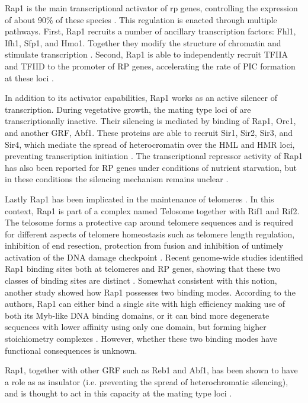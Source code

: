 Rap1 is the main transcriptional activator of \gls{rp} genes, controlling the expression of about 90\% of these species \cite{moehle:1991:association}. 
This regulation is enacted through multiple pathways.
First, Rap1 recruits a number of ancillary transcription factors: Fhl1, Ifh1, Sfp1, and Hmo1. Together they modify the structure of chromatin and stimulate transcription \cite{reja:2015:molecular}. 
Second, Rap1 is able to independently recruit TFIIA and TFIID to the promoter of RP genes, accelerating the rate of PIC formation at these loci \cite{papai:2010:tfiia}.


In addition to its activator capabilities, Rap1 works as an active silencer of transcription. 
During vegetative growth, the mating type loci of \cer{} are transcriptionally inactive. 
Their silencing is mediated by binding of Rap1, Orc1, and another GRF, Abf1. 
These proteins are able to recruit Sir1, Sir2, Sir3, and Sir4, which mediate the spread of heterocromatin over the HML and HMR loci, preventing transcription initiation \cite{kurtz:1991:rap1}. 
The transcriptional repressor activity of Rap1 has also been reported for RP genes under conditions of nutrient starvation, but in these conditions the silencing mechanism remains unclear \cite{reja:2015:molecular}. 


Lastly Rap1 has been implicated in the maintenance of telomeres \cite{lustig:1990:involvement}. 
In this context, Rap1 is part of a complex named Telosome together with Rif1 and Rif2. 
The telosome forms a protective cap around telomere sequences and is required for different aspects of telomere homeostasis such as telomere length regulation, inhibition of end resection, protection from fusion and inhibition of untimely activation of the DNA damage checkpoint \cite[for review see][]{wellinger:2012:everything}. 
Recent genome-wide studies identified Rap1 binding sites both at telomeres and RP genes, showing that these two classes of binding sites are distinct \cite{rhee:2011:comprehensive}. 
Somewhat consistent with this notion, another study showed how Rap1 possesses two binding modes. 
According to the authors, Rap1 can either bind a single site with high efficiency making use of both its Myb-like DNA binding domains, or it can bind more degenerate sequences with lower affinity using only one domain, but forming higher stoichiometry complexes \cite{feldmann:2014:dnabinding}. 
However, whether these two binding modes have functional consequences is unknown.

Rap1, together with other GRF such as Reb1 and Abf1, has been shown to have a role as as insulator (i.e. preventing the spread of heterochromatic silencing), and is thought to act in this capacity at the mating type loci \cite{fourel:2002:general}.


